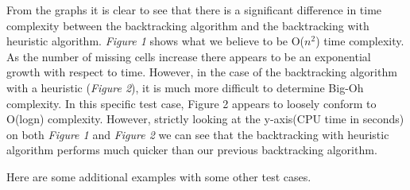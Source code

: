\documentclass{article}
\begin{document}
From the graphs it is clear to see that there is a significant difference in
time complexity between the backtracking algorithm and the backtracking
with heuristic algorithm. \textit{Figure 1} shows what we believe to be O($n^2$) 
time complexity. As the number of missing cells increase there appears 
to be an exponential growth with respect to time. However, in the case of the backtracking algorithm with
a heuristic (\textit{Figure 2}), it is much more difficult to determine Big-Oh complexity. In this 
specific test case, Figure 2 appears to loosely conform to O(logn) complexity. However,
strictly looking at the y-axis(CPU time in seconds) on both \textit{Figure 1} and \textit{Figure 2} we can see that the backtracking 
with heuristic algorithm performs much quicker than our previous backtracking algorithm.

\bigskip

Here are some additional examples with some other test cases.


\bigskip
\end{document}
